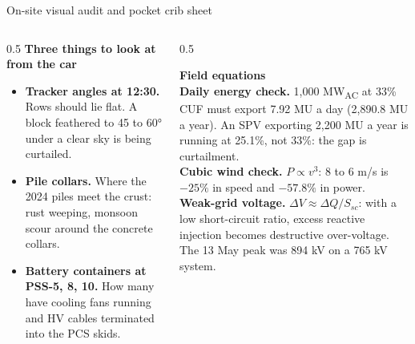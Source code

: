 \documentclass[10pt,aspectratio=169]{beamer}
\newcommand{\dia}[2]{\resizebox{!}{#2}{}}      %
\newenvironment{pts}{\begin{itemize}\footnotesize\setlength{\itemsep}{3pt}}{\end{itemize}}
\begin{document}
\begin{frame}[t]{On-site visual audit and pocket crib sheet}
  \begin{columns}[T]
    \begin{column}{0.5\textwidth}
      {\footnotesize\textbf{Three things to look at from the car}}
      \begin{pts}
        \item \textbf{Tracker angles at 12:30.} Rows should lie flat. A block feathered to 45 to 60° under a clear sky is being curtailed.
        \item \textbf{Pile collars.} Where the 2024 piles meet the crust: rust weeping, monsoon scour around the concrete collars.
        \item \textbf{Battery containers at PSS-5, 8, 10.} How many have cooling fans running and HV cables terminated into the PCS skids.
      \end{pts}
      \centering\dia{d26_tracker_angles}{2.6cm}
    \end{column}
    \begin{column}{0.5\textwidth}
      \begin{tcolorbox}[colback=SpNearBlack,colframe=SpNearBlack,arc=3pt,left=3mm,right=3mm,top=2mm,bottom=2mm,coltext=white]
        {\footnotesize\textbf{\textcolor{SpOrange}{Field equations}}}\\[4pt]
        {\scriptsize
        \textbf{Daily energy check.} 1,000 MW\textsubscript{AC} at 33\% CUF must export 7.92 MU a day (2,890.8 MU a year). An SPV exporting 2,200 MU a year is running at \textcolor{SpOrange}{25.1\%}, not 33\%: the gap is curtailment.\\[5pt]
        \textbf{Cubic wind check.} $P \propto v^{3}$: 8 to 6 m/s is $-25\%$ in speed and \textcolor{SpOrange}{$-57.8\%$} in power.\\[5pt]
        \textbf{Weak-grid voltage.} $\Delta V \approx \Delta Q / S_{sc}$: with a low short-circuit ratio, excess reactive injection becomes destructive over-voltage. The 13 May peak was \textcolor{SpOrange}{894 kV} on a 765 kV system.}
      \end{tcolorbox}
    \end{column}
  \end{columns}
\end{frame}
\end{document}
